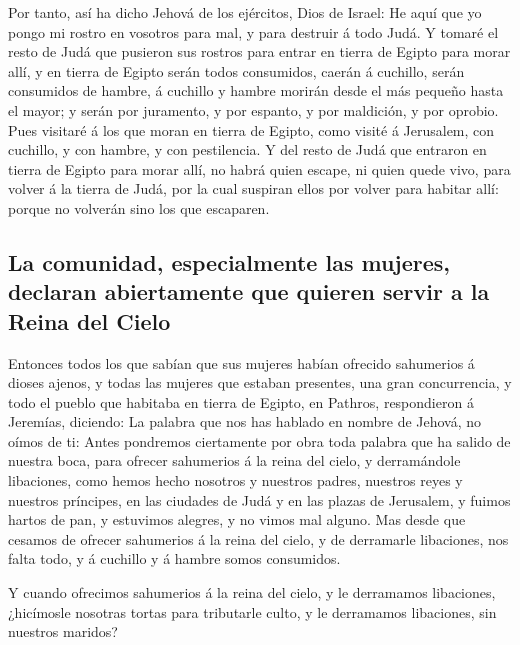  Por tanto, así ha dicho Jehová de los ejércitos, Dios de
Israel: He aquí que yo pongo mi rostro en vosotros para mal, y para
destruir á todo Judá.  Y tomaré el resto de Judá que
pusieron sus rostros para entrar en tierra de Egipto para morar allí, y
en tierra de Egipto serán todos consumidos, caerán á cuchillo, serán
consumidos de hambre, á cuchillo y hambre morirán desde el más pequeño
hasta el mayor; y serán por juramento, y por espanto, y por maldición, y
por oprobio.  Pues visitaré á los que moran en tierra de
Egipto, como visité á Jerusalem, con cuchillo, y con hambre, y con
pestilencia.  Y del resto de Judá que entraron en tierra
de Egipto para morar allí, no habrá quien escape, ni quien quede vivo,
para volver á la tierra de Judá, por la cual suspiran ellos por volver
para habitar allí: porque no volverán sino los que escaparen.

\hypertarget{la-comunidad-especialmente-las-mujeres-declaran-abiertamente-que-quieren-servir-a-la-reina-del-cielo}{%
\subsection{La comunidad, especialmente las mujeres, declaran
abiertamente que quieren servir a la Reina del
Cielo}\label{la-comunidad-especialmente-las-mujeres-declaran-abiertamente-que-quieren-servir-a-la-reina-del-cielo}}

 Entonces todos los que sabían que sus mujeres habían
ofrecido sahumerios á dioses ajenos, y todas las mujeres que estaban
presentes, una gran concurrencia, y todo el pueblo que habitaba en
tierra de Egipto, en Pathros, respondieron á Jeremías, diciendo:
 La palabra que nos has hablado en nombre de Jehová, no
oímos de ti:  Antes pondremos ciertamente por obra toda
palabra que ha salido de nuestra boca, para ofrecer sahumerios á la
reina del cielo, y derramándole libaciones, como hemos hecho nosotros y
nuestros padres, nuestros reyes y nuestros príncipes, en las ciudades de
Judá y en las plazas de Jerusalem, y fuimos hartos de pan, y estuvimos
alegres, y no vimos mal alguno.  Mas desde que cesamos de
ofrecer sahumerios á la reina del cielo, y de derramarle libaciones, nos
falta todo, y á cuchillo y á hambre somos consumidos.

 Y cuando ofrecimos sahumerios á la reina del cielo, y le
derramamos libaciones, ¿hicímosle nosotras tortas para tributarle culto,
y le derramamos libaciones, sin nuestros maridos?


